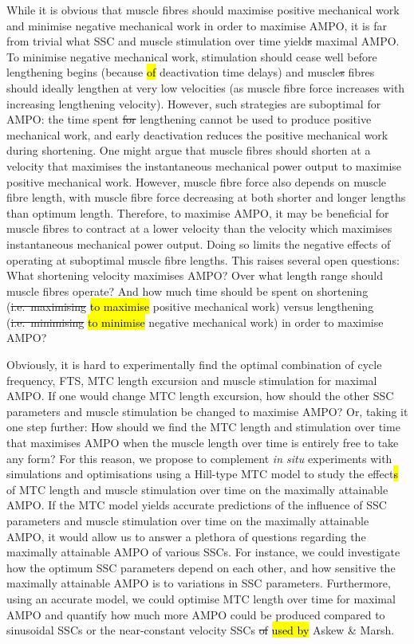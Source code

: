 \documentclass[
  10pt,
  letterpaper,
]{article}
\begin{document}
While it is obvious that muscle fibres should maximise positive
mechanical work and minimise negative mechanical work in order to
maximise AMPO, it is far from trivial what SSC and muscle stimulation
over time yield\st{s} maximal AMPO. To minimise negative mechanical
work, stimulation should cease well before lengthening begins (because
\hl{of} deactivation time delays) and muscle\st{s} fibres should ideally
lengthen at very low velocities (as muscle fibre force increases with
increasing lengthening velocity). However, such strategies are
suboptimal for AMPO: the time spent \st{for} lengthening cannot be used
to produce positive mechanical work, and early deactivation reduces the
positive mechanical work during shortening. One might argue that muscle
fibres should shorten at a velocity that maximises the instantaneous
mechanical power output to maximise positive mechanical work. However,
muscle fibre force also depends on muscle fibre length, with muscle
fibre force decreasing at both shorter and longer lengths than optimum
length. Therefore, to maximise AMPO, it may be beneficial for muscle
fibres to contract at a lower velocity than the velocity which maximises
instantaneous mechanical power output. Doing so limits the negative
effects of operating at suboptimal muscle fibre lengths. This raises
several open questions: What shortening velocity maximises AMPO? Over
what length range should muscle fibres operate? And how much time should
be spent on shortening (\st{i.e.~maximising} \hl{to maximise} positive
mechanical work) versus lengthening (\st{i.e.~minimising} \hl{to
minimise} negative mechanical work) in order to maximise AMPO?

Obviously, it is hard to experimentally find the optimal combination of
cycle frequency, FTS, MTC length excursion and muscle stimulation for
maximal AMPO. If one would change MTC length excursion, how should the
other SSC parameters and muscle stimulation be changed to maximise AMPO?
Or, taking it one step further: How should we find the MTC length and
stimulation over time that maximises AMPO when the muscle length over
time is entirely free to take any form? For this reason, we propose to
complement \emph{in situ} experiments with simulations and optimisations
using a Hill-type MTC model to study the effect\hl{s} of MTC length and
muscle stimulation over time on the maximally attainable AMPO. If the
MTC model yields accurate predictions of the influence of SSC parameters
and muscle stimulation over time on the maximally attainable AMPO, it
would allow us to answer a plethora of questions regarding the maximally
attainable AMPO of various SSCs. For instance, we could investigate how
the optimum SSC parameters depend on each other, and how sensitive the
maximally attainable AMPO is to variations in SSC parameters.
Furthermore, using an accurate model, we could optimise MTC length over
time for maximal AMPO and quantify how much more AMPO could be produced
compared to sinusoidal SSCs or the near-constant velocity SSCs \st{of}
\hl{used by} Askew \& Marsh.
\end{document}
